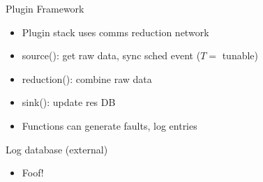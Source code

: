 \documentclass[default,pdf,colorBG,slideColor]{prosper}
\begin{document}
\begin{slide}{Plugin Framework}{\small
\begin{center}
\begin{minipage}[b]{0.4\linewidth}
\end{minipage}
\hspace{0.5cm}
\begin{minipage}[b]{0.4\linewidth}
\end{minipage}
\end{center}
\begin{itemize}
  \item{Plugin stack uses comms reduction network}
  \item{source(): get raw data, sync sched event ($T=$ tunable)}
  \item{reduction(): combine raw data}
  \item{sink(): update res DB}
  \item{Functions can generate faults, log entries}
\end{itemize}
}\end{slide}
\begin{slide}{Log database (external)}{\small
\begin{itemize}
  \item{Foof!}
\end{itemize}
}\end{slide}
\end{document}
